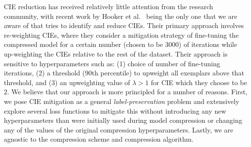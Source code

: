 CIE reduction has received relatively little attention from the research community, with recent work by Hooker et al.~\cite{hooker2020characterising} being the only one that we are aware of that tries to identify and reduce CIEs. Their primary approach  involves re-weighting CIEs, where they consider a mitigation strategy of fine-tuning the compressed model for a certain number (chosen to be 3000) of iterations while up-weighting the CIEs relative
to the rest of the dataset. Their approach is sensitive to hyperparameters such as: (1) choice of number of fine-tuning iterations, (2) a threshold (90th percentile) to upweight all exemplars above that threshold, and (3) an upweighting value of $\lambda > 1$ for CIE which they choose to be $2$. We believe that our approach  is more principled for a number of reasons. First, we pose CIE mitigation as a general \emph{label-preservation} problem and extensively explore several loss functions to mitigate this without introducing any new hyperparameters than were initially used during model compression or changing any of the values of the original compression hyperparameters. Lastly, we are agnostic to the compression scheme and compression algorithm.





